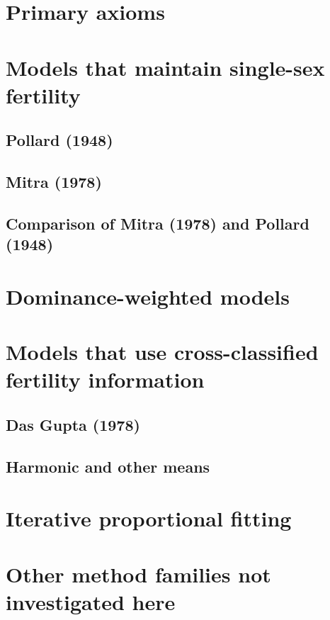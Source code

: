     \section{Primary axioms}
      
    \section{Models that maintain single-sex fertility}
      \subsection{Pollard (1948)}
       
      \subsection{Mitra (1978)}
        
      \subsection{Comparison of Mitra (1978) and Pollard (1948)}
       
  \section{Dominance-weighted models}
     
  \section{Models that use cross-classified fertility information}
     \subsection{Das Gupta (1978)}
       
     \subsection{Harmonic and other means}
       
     

  \section{Iterative proportional fitting}
      
  \section{Other method families not investigated here}
     


